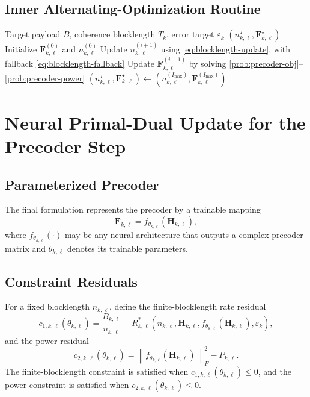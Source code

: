 \documentclass[11pt]{article}
\newcommand{\F}{\mathbf{F}}
\newcommand{\Hc}{\mathbf{H}}
\newcommand{\norm}[1]{\left\lVert #1 \right\rVert}
\begin{document}
\subsection{Inner Alternating-Optimization Routine}
\begin{algorithm}[ht]
\caption{Alternating Optimization for $\mathrm{AO}_k(B,T_k,\varepsilon_k)$}
\label{alg:ao}
\begin{algorithmic}[1]
\Require Target payload $B$, coherence blocklength $T_k$, error target $\varepsilon_k$
\Ensure $(n_{k,\ell}^\star,\F_{k,\ell}^\star)$
\State Initialize $\F_{k,\ell}^{(0)}$ and $n_{k,\ell}^{(0)}$
    \State Update $n_{k,\ell}^{(i+1)}$ using \eqref{eq:blocklength-update}, with fallback \eqref{eq:blocklength-fallback}
    \State Update $\F_{k,\ell}^{(i+1)}$ by solving \eqref{prob:precoder-obj}--\eqref{prob:precoder-power}
\EndFor
\State $(n_{k,\ell}^\star,\F_{k,\ell}^\star) \gets (n_{k,\ell}^{(I_{\max})},\F_{k,\ell}^{(I_{\max})})$
\end{algorithmic}
\end{algorithm}

\section{Neural Primal-Dual Update for the Precoder Step}
\subsection{Parameterized Precoder}
The final formulation represents the precoder by a trainable mapping
\begin{equation}
\F_{k,\ell} = f_{\theta_{k,\ell}}(\Hc_{k,\ell}),
\label{eq:nn-precoder}
\end{equation}
where $f_{\theta_{k,\ell}}(\cdot)$ may be any neural architecture that outputs a complex precoder matrix and $\theta_{k,\ell}$ denotes its trainable parameters.

\subsection{Constraint Residuals}
For a fixed blocklength $n_{k,\ell}$, define the finite-blocklength rate residual
\begin{equation}
c_{1,k,\ell}(\theta_{k,\ell})
=
\frac{B_{k,\ell}}{n_{k,\ell}}
-
R_{k,\ell}^*(n_{k,\ell},\Hc_{k,\ell},f_{\theta_{k,\ell}}(\Hc_{k,\ell}),\varepsilon_k),
\label{eq:c1}
\end{equation}
and the power residual
\begin{equation}
c_{2,k,\ell}(\theta_{k,\ell})
=
\norm{f_{\theta_{k,\ell}}(\Hc_{k,\ell})}_F^2 - P_{k,\ell}.
\label{eq:c2}
\end{equation}
The finite-blocklength constraint is satisfied when $c_{1,k,\ell}(\theta_{k,\ell}) \le 0$, and the power constraint is satisfied when $c_{2,k,\ell}(\theta_{k,\ell}) \le 0$.
\end{document}
